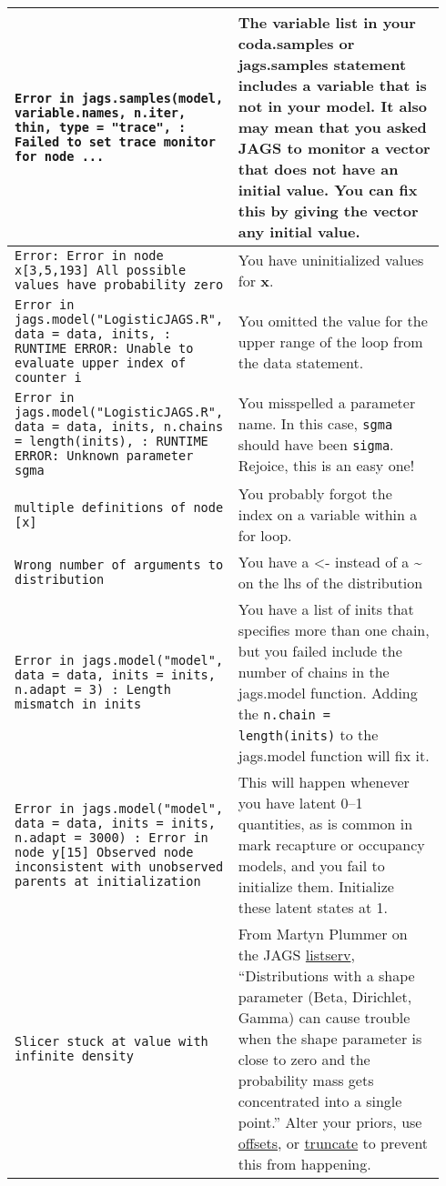 \documentclass[12pt,english]{article}
\begin{document}
\begin{center}
\begin{longtable}{|p{0.46\linewidth}|p{0.48\linewidth}|}
\hline 
\texttt{Error in jags.samples(model, variable.names, n.iter, thin, type = "trace", : Failed to set trace monitor for node ...}& The variable list in your coda.samples or jags.samples statement includes a variable that is not in your model. It also may mean that you asked JAGS to monitor a vector that does not have an initial value. You can fix this by giving the vector any initial value.\\
\hline 
\texttt{Error: Error in node x[3,5,193] All possible values have probability zero} & You have uninitialized values for \textbf{x}.\\
\hline 
\texttt{Error in jags.model("LogisticJAGS.R", data = data, inits, : RUNTIME ERROR: Unable to evaluate upper index of counter i} & You omitted the value for the upper range of the loop from the data statement.\\
\hline 
\texttt{Error in jags.model("LogisticJAGS.R", data = data, inits, n.chains = length(inits), : RUNTIME ERROR: Unknown parameter sgma} & You misspelled a parameter name. In this case, \texttt{sgma} should have been \texttt{sigma}. Rejoice, this is an easy one!\\
\hline 
\texttt{multiple definitions of node [x]} & You probably forgot the index on a variable within a for loop.\\
\hline 
\texttt{Wrong number of arguments to distribution} & You have a <- instead of a \textasciitilde{} on the lhs of the distribution\\
\hline 
\texttt{Error in jags.model("model", data = data, inits = inits, n.adapt = 3) : Length mismatch in inits} & You have a list of inits that specifies more than one chain, but you failed include the number of chains in the jags.model function. Adding the \texttt{n.chain = length(inits)} to the jags.model function will fix it.\\
\hline 
\texttt{Error in jags.model("model", data = data, inits = inits, n.adapt = 3000) : Error in node y[15] Observed node inconsistent with unobserved parents at initialization} & This will happen whenever you have latent 0--1 quantities, as is common in mark recapture or occupancy models, and you fail to initialize them. Initialize these latent states at 1.\\
\hline 
\texttt{Slicer stuck at value with infinite density} & From Martyn Plummer on the JAGS \href{https://sourceforge.net/p/mcmc-jags/discussion/610037/thread/c21ef62a/}{listserv}, \enquote{Distributions with a shape parameter (Beta, Dirichlet, Gamma) can cause trouble when the shape parameter is close to zero and the probability mass gets concentrated into a single point.} Alter your priors, use \href{https://sourceforge.net/p/mcmc-jags/discussion/610037/thread/c21ef62a/}{offsets}, or \href{https://sourceforge.net/p/mcmc-jags/discussion/610037/thread/8cf14eb0/}{truncate} to prevent this from happening.\\

\end{longtable}
\end{center}
\end{document}
